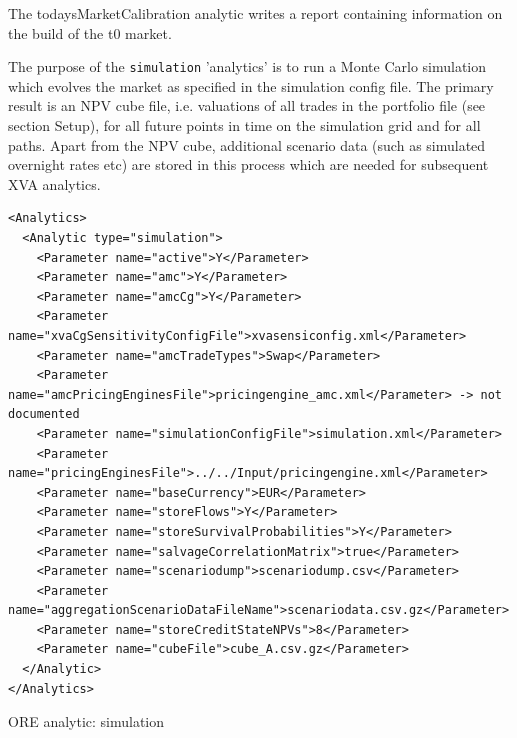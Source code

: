 \documentclass[12pt, a4paper]{article}
\begin{document}
The todaysMarketCalibration analytic writes a report containing information on the build of the t0 market.

\medskip The purpose of the {\tt simulation} 'analytics' is to run a Monte Carlo simulation which evolves the market as
specified in the simulation config file. The primary result is an NPV cube file, i.e. valuations of all trades in the
portfolio file (see section Setup), for all future points in time on the simulation grid and for all paths. Apart from
the NPV cube, additional scenario data (such as simulated overnight rates etc) are stored in this process which are
needed for subsequent XVA analytics.

\begin{listing}[H]
\begin{verbatim}
<Analytics>
  <Analytic type="simulation">
    <Parameter name="active">Y</Parameter>
    <Parameter name="amc">Y</Parameter>
    <Parameter name="amcCg">Y</Parameter>
    <Parameter name="xvaCgSensitivityConfigFile">xvasensiconfig.xml</Parameter>
    <Parameter name="amcTradeTypes">Swap</Parameter>
    <Parameter name="amcPricingEnginesFile">pricingengine_amc.xml</Parameter> -> not documented
    <Parameter name="simulationConfigFile">simulation.xml</Parameter>
    <Parameter name="pricingEnginesFile">../../Input/pricingengine.xml</Parameter>
    <Parameter name="baseCurrency">EUR</Parameter>
    <Parameter name="storeFlows">Y</Parameter>
    <Parameter name="storeSurvivalProbabilities">Y</Parameter>
    <Parameter name="salvageCorrelationMatrix">true</Parameter>
    <Parameter name="scenariodump">scenariodump.csv</Parameter>
    <Parameter name="aggregationScenarioDataFileName">scenariodata.csv.gz</Parameter>
    <Parameter name="storeCreditStateNPVs">8</Parameter>
    <Parameter name="cubeFile">cube_A.csv.gz</Parameter>
  </Analytic>
</Analytics>      
\end{verbatim}
\caption{ORE analytic: simulation}
\label{lst:ore_simulation}
\end{listing}
\end{document}
